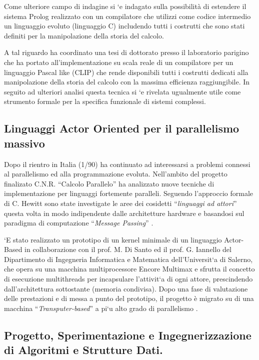 \documentclass[11pt]{article}
\begin{document}
Come ulteriore campo di indagine si \a`e indagato sulla possibilit\`a
di estendere il sistema Prolog realizzato con un compilatore che
utilizzi come codice intermedio un linguaggio evoluto (linguaggio C)
includendo tutti i costrutti che sono stati definiti per la
manipolazione della storia del calcolo.

A tal riguardo ha coordinato una tesi di dottorato presso il
laboratorio parigino che ha portato all'implementazione su scala
reale di un compilatore per un linguaggio Pascal like (CLIP) che rende
disponibili tutti i costrutti dedicati alla manipolazione della storia
del calcolo con la massima efficienza raggiungibile.  In seguito ad
ulteriori analisi questa tecnica si \a`e rivelata ugualmente utile
come strumento formale per la specifica funzionale di sistemi
complessi.


\subsection{Linguaggi Actor Oriented per il parallelismo massivo}

Dopo il rientro in Italia (1/90) ha continuato ad interessarsi a
problemi connessi al parallelismo ed alla programmazione evoluta.
Nell'ambito del progetto finalizato C.N.R. ``Calcolo Parallelo'' ha
analizzato nuove tecniche di implementazione per linguaggi fortemente
paralleli. Seguendo l'approccio formale di C. Hewitt sono state
investigate le aree dei cosidetti ``{\sl linguaggi ad attori}'' questa
volta in modo indipendente dalle architetture hardware e basandosi
sul paradigma di computazione ``{\sl Message Passing}''
\cite{ISCIS:3,ISCIS:4}.

\a`E stato realizzato un prototipo di un kernel minimale di un
linguaggio Actor-Based in collaborazione con il prof. M. Di Santo ed
il prof. G. Iannello del Dipartimento di Ingegneria Informatica e
Matematica dell'Universit\a`a di Salerno, che opera su una macchina
multiprocessore Encore Multimax e sfrutta il concetto di esecuzione
multithreads \cite{threads:1} per incapsulare l'attivit\a`a di ogni
attore, prescindendo dall'architettura sottostante (memoria
condivisa).  Dopo una fase di valutazione delle prestazioni e di messa
a punto del prototipo, il progetto \`e migrato su di una macchina
``{\sl Transputer-based}'' a pi\a`u alto grado di parallelismo
\cite{AICA:1,AICA:2}.


\subsection{Progetto, Sperimentazione e Ingegnerizzazione di Algoritmi e Strutture Dati.}
\end{document}
